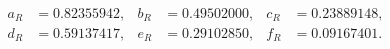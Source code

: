 \begin{align}
 a_R&=0.82355942, & b_R&=0.49502000, & c_R&=0.23889148,\nonumber\\
 d_R&=0.59137417, & e_R&=0.29102850, & f_R&=0.09167401.
 \label{eq:rational_coeffs}
\end{align}
